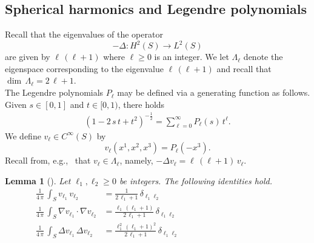 \documentclass[11pt]{amsart}
\newtheorem{lemma}[theorem]{Lemma}
\theoremstyle {definition}
\begin{document}
\begin{appendices} 

 
\section{Spherical harmonics and Legendre polynomials}\label{spherical harmonics}
Recall that the eigenvalues of the operator 
	$$-\Delta:H^{2}(S)\to L^2(S)$$
	are given by
	$
	\ell\,(\ell+1)
	$	where $\ell\geq0$ is an integer. We let $\Lambda_\ell$ denote the eigenspace corresponding to the eigenvalue $\ell\,(\ell+1)$ and recall that $\dim\,\Lambda_\ell=2\,\ell+1$.  \\ \indent The Legendre polynomials $P_\ell$ may be defined via a generating function as follows. Given $s\in[0,1]$ and $t\in[0,1)$, there holds
\begin{align*}
	(1-2\,s\,t+t^2)^{-\frac12}=\sum_{\ell=0}^\infty P_\ell(s)\,t^\ell. %
\end{align*} 
We define $v_\ell\in C^\infty(S)$ by $$v_\ell(x^1,x^2,x^3)=P_\ell(-x^3). $$ Recall from, e.g.,~\cite[\S8]{CourantHilbert} that $v_\ell\in \Lambda_\ell$, namely, $-\Delta v_{\ell}=\ell\,(\ell+1)\,v_\ell$. 
\begin{lemma}[{\cite[\S8]{CourantHilbert}}] \label{inner products}
Let $\ell_1,\ell_2\geq 0$ be integers. The following identities  hold.
\begin{align*} 
	 		\frac{1}{4\,\pi}\,\int_S v_{\ell_1}\,v_{\ell_2}&=\frac{1}{2\,\ell_1+1}\,\delta_{\ell_1\ell_2}\qquad\qquad\qquad\qquad\qquad\qquad\qquad\\ 
	\frac{1}{4\,\pi}\,\int_S \nabla v_{\ell_1}\cdot \nabla v_{\ell_2}&=\frac{\ell_1\,(\ell_1+1)}{2\,\ell_1+1}\,\delta_{\ell_1\ell_2}\\ 
	\frac{1}{4\,\pi}\,\int_S \Delta v_{\ell_1}\,\Delta v_{\ell_2}&=\frac{\ell_1^2\,(\ell_1+1)^2}{2\,\ell_1+1}\,\delta_{\ell_1\ell_2}
\end{align*} 


\end{lemma}
\end{appendices}
\end{document}
